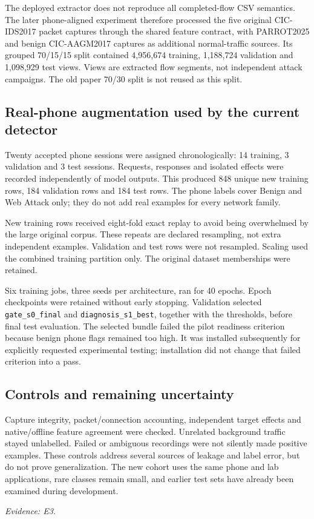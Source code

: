 \documentclass[11pt,a4paper]{article}
\newcommand{\source}[1]{{\small\textit{Evidence: #1.}\par}}
\begin{document}
The deployed extractor does not reproduce all completed-flow CSV semantics. The later
phone-aligned experiment therefore processed the five original CIC-IDS2017 packet captures
through the shared feature contract, with PARROT2025 and benign CIC-AAGM2017 captures as
additional normal-traffic sources. Its grouped 70/15/15 split contained 4,956,674 training,
1,188,724 validation and 1,098,929 test views. Views are extracted flow segments, not
independent attack campaigns. The old paper 70/30 split is not reused as this split.

\subsection*{Real-phone augmentation used by the current detector}
Twenty accepted phone sessions were assigned chronologically: 14 training, 3 validation
and 3 test sessions. Requests, responses and isolated effects were recorded independently
of model outputs. This produced 848 unique new training rows, 184 validation rows and
184 test rows. The phone labels cover Benign and Web Attack only; they do not add real
examples for every network family.

New training rows received eight-fold exact replay to avoid being overwhelmed by the
large original corpus. These repeats are declared resampling, not extra independent
examples. Validation and test rows were not resampled. Scaling used the combined
training partition only. The original dataset memberships were retained.

Six training jobs, three seeds per architecture, ran for 40 epochs. Epoch checkpoints
were retained without early stopping. Validation selected \texttt{gate\_s0\_final} and
\texttt{diagnosis\_s1\_best}, together with the thresholds, before final test evaluation.
The selected bundle failed the pilot readiness criterion because benign phone flags
remained too high. It was installed subsequently for explicitly requested experimental
testing; installation did not change that failed criterion into a pass.

\subsection*{Controls and remaining uncertainty}
Capture integrity, packet/connection accounting, independent target effects and
native/offline feature agreement were checked. Unrelated background traffic stayed
unlabelled. Failed or ambiguous recordings were not silently made positive examples.
These controls address several sources of leakage and label error, but do not prove
generalization. The new cohort uses the same phone and lab applications, rare classes
remain small, and earlier test sets have already been examined during development.
\source{E3}
\end{document}
